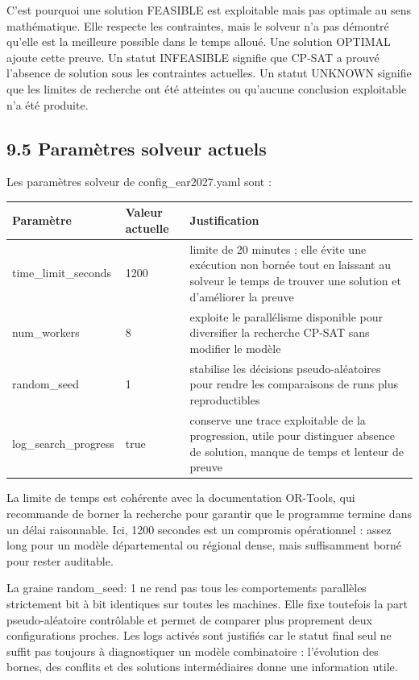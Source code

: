 \documentclass[11pt,a4paper]{article}
\begin{document}
C'est pourquoi une solution FEASIBLE est exploitable mais pas optimale au sens mathématique. Elle respecte les contraintes, mais le solveur n'a pas démontré qu'elle est la meilleure possible dans le temps alloué. Une solution OPTIMAL ajoute cette preuve. Un statut INFEASIBLE signifie que CP-SAT a prouvé l'absence de solution sous les contraintes actuelles. Un statut UNKNOWN signifie que les limites de recherche ont été atteintes ou qu'aucune conclusion exploitable n'a été produite.

\subsection{9.5 Paramètres solveur actuels}

Les paramètres solveur de config\_ear2027.yaml sont :

\begin{longtable}{|L{0.24\textwidth}|L{0.18\textwidth}|L{0.48\textwidth}|}
\hline
Paramètre & Valeur actuelle & Justification \\
\hline
\endhead
time\_limit\_seconds & 1200 & limite de 20 minutes ; elle évite une exécution non bornée tout en laissant au solveur le temps de trouver une solution et d'améliorer la preuve \\
\hline
num\_workers & 8 & exploite le parallélisme disponible pour diversifier la recherche CP-SAT sans modifier le modèle \\
\hline
random\_seed & 1 & stabilise les décisions pseudo-aléatoires pour rendre les comparaisons de runs plus reproductibles \\
\hline
log\_search\_progress & true & conserve une trace exploitable de la progression, utile pour distinguer absence de solution, manque de temps et lenteur de preuve \\
\hline
\end{longtable}

La limite de temps est cohérente avec la documentation OR-Tools, qui recommande de borner la recherche pour garantir que le programme termine dans un délai raisonnable. Ici, 1200 secondes est un compromis opérationnel : assez long pour un modèle départemental ou régional dense, mais suffisamment borné pour rester auditable.

La graine random\_seed: 1 ne rend pas tous les comportements parallèles strictement bit à bit identiques sur toutes les machines. Elle fixe toutefois la part pseudo-aléatoire contrôlable et permet de comparer plus proprement deux configurations proches. Les logs activés sont justifiés car le statut final seul ne suffit pas toujours à diagnostiquer un modèle combinatoire : l'évolution des bornes, des conflits et des solutions intermédiaires donne une information utile.
\end{document}
